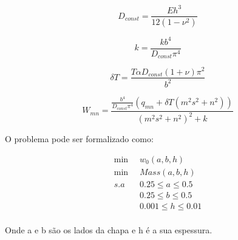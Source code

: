 \documentclass[a4paper,12pt]{article}
\begin{document}
\begin{equation}\label{eq:fo}
D_{const}=\frac{E h^3}{12\left(1-{\nu}^2\right)}
\end{equation}

\begin{equation}\label{eq:fo}
k=\frac{k b^4}{D_{const} {\pi}^4}
\end{equation}

\begin{equation}\label{eq:fo}
\delta T=\frac{T \alpha D_{const} \left(1+\nu\right) {\pi}^2}{b^2}
\end{equation}

\begin{equation}\label{eq:fo}
W_{mn}=\frac{\frac{b^4}{D_{const} {\pi}^4} \left(q_{mn}+\delta T \left(m^2 s^2+n^2\right)\right)}{{\left(m^2 s^2+n^2\right)}^2+k}
\end{equation}


O problema pode ser formalizado como:

\begin{equation}\label{eq:prob}
\begin{split}
\min\;\; &w_{0}(a, b, h)\\
\min\;\; &Mass(a, b, h)\\
s.a\;\; & 0.25\leq a\leq 0.5\\
& 0.25\leq b\leq 0.5\\
& 0.001\leq h\leq 0.01\\
\end{split}
\end{equation}

Onde a e b são os lados da chapa e h é a sua espessura.
\end{document}
